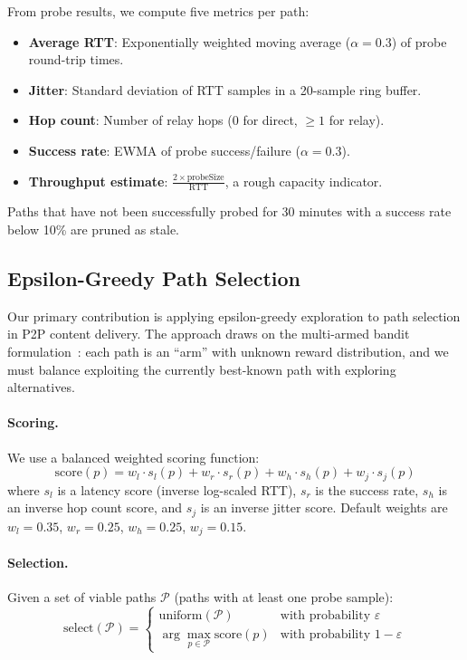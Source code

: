 \documentclass[sigconf,nonacm]{acmart}
\begin{document}
From probe results, we compute five metrics per path:
\begin{itemize}
\item \textbf{Average RTT}: Exponentially weighted moving average ($\alpha = 0.3$) of probe round-trip times.
\item \textbf{Jitter}: Standard deviation of RTT samples in a 20-sample ring buffer.
\item \textbf{Hop count}: Number of relay hops (0 for direct, $\geq 1$ for relay).
\item \textbf{Success rate}: EWMA of probe success/failure ($\alpha = 0.3$).
\item \textbf{Throughput estimate}: $\frac{2 \times \text{probeSize}}{\text{RTT}}$, a rough capacity indicator.
\end{itemize}

Paths that have not been successfully probed for 30 minutes with a success rate below 10\% are pruned as stale.

\subsection{Epsilon-Greedy Path Selection}
\label{sec:epsilon}

Our primary contribution is applying epsilon-greedy exploration to path selection in P2P content delivery. The approach draws on the multi-armed bandit formulation~\cite{robbins1952sequential,auer2002bandit}: each path is an ``arm'' with unknown reward distribution, and we must balance exploiting the currently best-known path with exploring alternatives.

\paragraph{Scoring.} We use a balanced weighted scoring function:
\begin{equation}
\text{score}(p) = w_l \cdot s_l(p) + w_r \cdot s_r(p) + w_h \cdot s_h(p) + w_j \cdot s_j(p)
\label{eq:score}
\end{equation}
where $s_l$ is a latency score (inverse log-scaled RTT), $s_r$ is the success rate, $s_h$ is an inverse hop count score, and $s_j$ is an inverse jitter score. Default weights are $w_l = 0.35$, $w_r = 0.25$, $w_h = 0.25$, $w_j = 0.15$.

\paragraph{Selection.} Given a set of viable paths $\mathcal{P}$ (paths with at least one probe sample):
\begin{equation}
\text{select}(\mathcal{P}) =
\begin{cases}
\text{uniform}(\mathcal{P}) & \text{with probability } \varepsilon \\
\arg\max_{p \in \mathcal{P}} \text{score}(p) & \text{with probability } 1-\varepsilon
\end{cases}
\end{equation}
\end{document}

